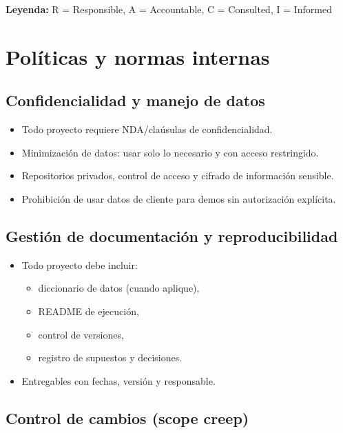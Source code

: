 \documentclass[
  spanish,
]{article}
\begin{document}
\textbf{Leyenda:} R = Responsible, A = Accountable, C = Consulted, I =
Informed

\section{Políticas y normas
internas}\label{poluxedticas-y-normas-internas}

\subsection{Confidencialidad y manejo de
datos}\label{confidencialidad-y-manejo-de-datos}

\begin{itemize}
\tightlist
\item
  Todo proyecto requiere NDA/claúsulas de confidencialidad.
\item
  Minimización de datos: usar solo lo necesario y con acceso
  restringido.
\item
  Repositorios privados, control de acceso y cifrado de información
  sensible.
\item
  Prohibición de usar datos de cliente para demos sin autorización
  explícita.
\end{itemize}

\subsection{Gestión de documentación y
reproducibilidad}\label{gestiuxf3n-de-documentaciuxf3n-y-reproducibilidad}

\begin{itemize}
\tightlist
\item
  Todo proyecto debe incluir:

  \begin{itemize}
  \tightlist
  \item
    diccionario de datos (cuando aplique),
  \item
    README de ejecución,
  \item
    control de versiones,
  \item
    registro de supuestos y decisiones.
  \end{itemize}
\item
  Entregables con fechas, versión y responsable.
\end{itemize}

\subsection{Control de cambios (scope
creep)}\label{control-de-cambios-scope-creep}
\end{document}
